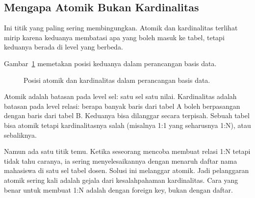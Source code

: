 \documentclass[11pt,a4paper]{article}
\begin{document}
\subsection{Mengapa Atomik Bukan Kardinalitas}

Ini titik yang paling sering membingungkan. Atomik dan kardinalitas terlihat mirip karena keduanya membatasi apa yang boleh masuk ke tabel, tetapi keduanya berada di level yang berbeda.

Gambar~\ref{fig:tree} memetakan posisi keduanya dalam perancangan basis data.

\begin{figure}[H]
	\centering
	\caption{Posisi atomik dan kardinalitas dalam perancangan basis data.}
	\label{fig:tree}
\end{figure}

Atomik adalah batasan pada level sel: satu sel satu nilai. Kardinalitas adalah batasan pada level relasi: berapa banyak baris dari tabel A boleh berpasangan dengan baris dari tabel B. Keduanya bisa dilanggar secara terpisah. Sebuah tabel bisa atomik tetapi kardinalitasnya salah (misalnya 1:1 yang seharusnya 1:N), atau sebaliknya.

Namun ada satu titik temu. Ketika seseorang mencoba membuat relasi 1:N tetapi tidak tahu caranya, ia sering menyelesaikannya dengan menaruh daftar nama mahasiswa di satu sel tabel dosen. Solusi ini melanggar atomik. Jadi pelanggaran atomik sering kali adalah gejala dari kesalahpahaman kardinalitas. Cara yang benar untuk membuat 1:N adalah dengan foreign key, bukan dengan daftar.
\end{document}
